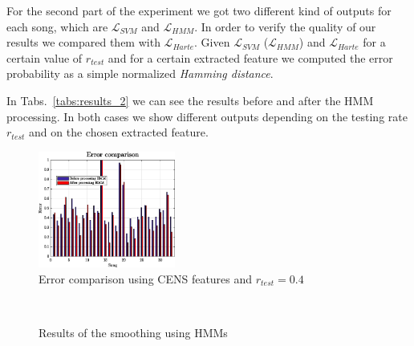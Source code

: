 %
For the second part of the experiment we got two different kind of outputs for each song, which are $\mathcal{L}_{SVM}$ and $\mathcal{L}_{HMM}$. In order to verify the quality of our results we compared them with  $\mathcal{L}_{Harte}$. Given $\mathcal{L}_{SVM}$ ($\mathcal{L}_{HMM}$) and $\mathcal{L}_{Harte}$ for a certain value of $r_{test}$ and for a certain extracted feature we computed the error probability as a simple normalized \textit{Hamming distance}.

In Tabs.~\ref{tabs:results_2} we can see the results before and after the HMM processing. In both cases we show different outputs depending on the testing rate $r_{test}$ and on the chosen extracted feature.
%
\begin{figure}[t]
	\centering
	\includegraphics[width=0.4\textwidth]{img/Result_HMM/CENS/plot03071}
	\vspace{-3mm}
	\caption{Error comparison using CENS features and $r_{test}=0.4$}
	\label{fig:compareerror}
	\vspace{-6mm}
\end{figure}
\begin{figure}[tb]
	\centering
	\\
	\vspace{-3mm}
	\caption{Results of the smoothing using HMMs}
	\vspace{-6mm}
\end{figure}
